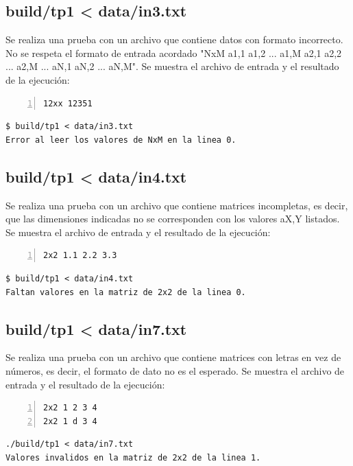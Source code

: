 \documentclass[a4paper,10pt]{article}
\begin{document}
\subsection{build/tp1 < data/in3.txt}
Se realiza una prueba con un archivo que contiene datos con formato incorrecto. No se respeta el formato de entrada acordado "NxM a1,1 a1,2 ... a1,M a2,1 a2,2 ... a2,M ... aN,1 aN,2 ... aN,M". Se muestra el archivo de entrada y el resultado de la ejecuci\'on:

\begin{lstlisting}[numbers=left,language=bash]
12xx 12351
\end{lstlisting}
\begin{lstlisting}
$ build/tp1 < data/in3.txt
Error al leer los valores de NxM en la linea 0.
\end{lstlisting}

\subsection{build/tp1 < data/in4.txt}
Se realiza una prueba con un archivo que contiene matrices incompletas, es decir, que las dimensiones indicadas no se corresponden con los valores aX,Y listados. Se muestra el archivo de entrada y el resultado de la ejecuci\'on:

\begin{lstlisting}[numbers=left,language=bash]
2x2 1.1 2.2 3.3
\end{lstlisting}
\begin{lstlisting}
$ build/tp1 < data/in4.txt
Faltan valores en la matriz de 2x2 de la linea 0.
\end{lstlisting}

\subsection{build/tp1 < data/in7.txt}
Se realiza una prueba con un archivo que contiene matrices con letras en vez de n\'umeros, es decir, el formato de dato no es el esperado. Se muestra el archivo de entrada y el resultado de la ejecuci\'on:

\begin{lstlisting}[numbers=left,language=bash]
2x2 1 2 3 4
2x2 1 d 3 4
\end{lstlisting}
\begin{lstlisting}
./build/tp1 < data/in7.txt
Valores invalidos en la matriz de 2x2 de la linea 1.
\end{lstlisting}

\newpage
\end{document}
